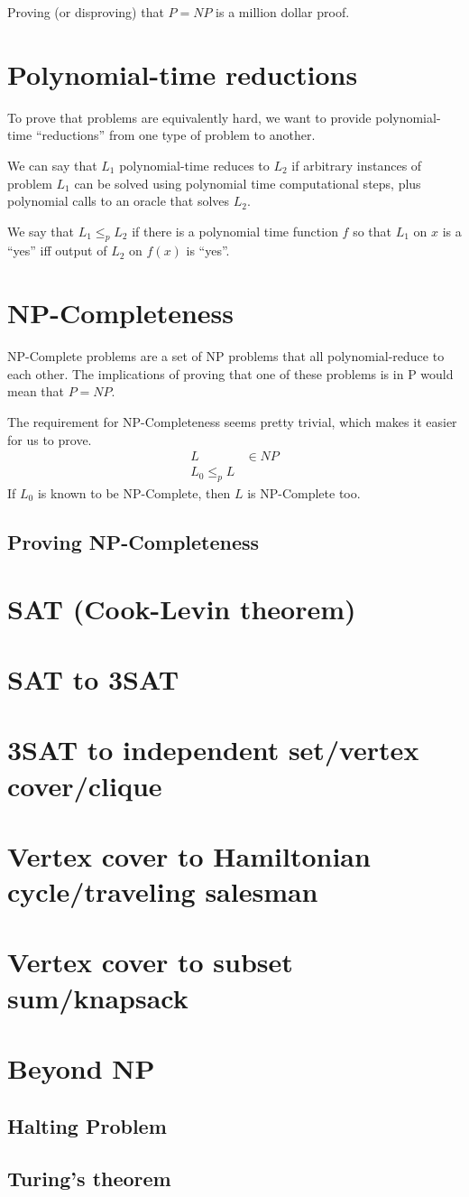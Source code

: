         Proving (or disproving) that $P = NP$ is a million dollar proof.
    \section{Polynomial-time reductions}
        To prove that problems are equivalently hard, we want to
        provide polynomial-time ``reductions'' from one type of problem to
        another.

        We can say that $L_1$ polynomial-time reduces to $L_2$ if arbitrary
        instances of problem $L_1$ can be solved using polynomial time
        computational steps, plus polynomial calls to an oracle that solves
        $L_2$.

        We say that $L_1 \le_p L_2$ if there is a polynomial time function $f$
        so that $L_1$ on $x$ is a ``yes'' iff output of $L_2$ on $f(x)$ is
        ``yes''.
    \section{NP-Completeness}
        NP-Complete problems are a set of NP problems that all polynomial-reduce
        to each other. The implications of proving that one of these problems is
        in P would mean that $P = NP$.

        The requirement for NP-Completeness seems pretty trivial, which makes it
        easier for us to prove.
        \begin{align*}
            L &\in NP \\
            L_0 \le_p L
        \end{align*}
        If $L_0$ is known to be NP-Complete, then $L$ is NP-Complete too.
        \subsection{Proving NP-Completeness}
    \section{SAT (Cook-Levin theorem)}
    \section{SAT to 3SAT}
    \section{3SAT to independent set/vertex cover/clique}
    \section{Vertex cover to Hamiltonian cycle/traveling salesman}
    \section{Vertex cover to subset sum/knapsack}
    \section{Beyond NP}
        \subsection{Halting Problem}
        \subsection{Turing's theorem}


